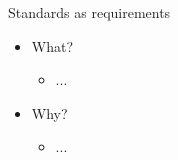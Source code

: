 \begin{Slide}{Standards as requirements}
\begin{itemize}
\item What?
\begin{itemize}
\item ...
\end{itemize}
\item Why?
\begin{itemize}
\item ...


\end{itemize}
\end{itemize}
\end{Slide}
